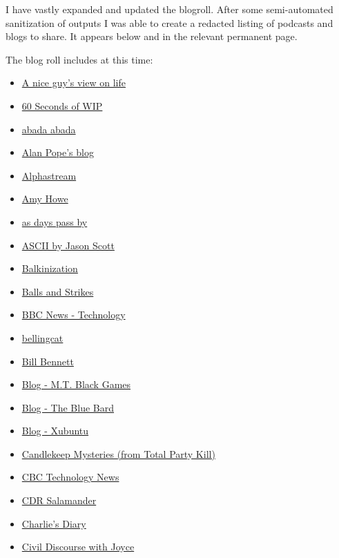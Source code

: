 I have vastly expanded and updated the blogroll. After some
semi-automated sanitization of outputs I was able to create a redacted
listing of podcasts and blogs to share. It appears below and in the
relevant permanent page.

The blog roll includes at this time:

\begin{itemize}
\item
  \href{https://jon.sprig.gs/blog}{A nice guy's view on life}
\item
  \href{https://mwl.io/}{60 Seconds of WIP}
\item
  \href{https://www.jessamyn.com/journal}{abada abada}
\item
  \href{https://popey.com/blog/}{Alan Pope's blog}
\item
  \href{https://alphastream.org/}{Alphastream}
\item
  \href{https://amylhowe.com/}{Amy Howe}
\item
  \href{https://www.kryogenix.org/days/}{as days pass by}
\item
  \href{http://ascii.textfiles.com/}{ASCII by Jason Scott}
\item
  \href{https://balkin.blogspot.com/}{Balkinization}
\item
  \href{https://ballsandstrikes.org/}{Balls and Strikes}
\item
  \href{https://www.bbc.co.uk/news/}{BBC News - Technology}
\item
  \href{https://www.bellingcat.com/}{bellingcat}
\item
  \href{https://billbennett.micro.blog/}{Bill Bennett}
\item
  \href{https://www.mtblackgames.com/blog/}{Blog - M.T. Black Games}
\item
  \href{https://www.thebluebard.com/blog/}{Blog - The Blue Bard}
\item
  \href{https://xubuntu.org/}{Blog - Xubuntu}
\item
  \href{https://www.theincomparable.com/tpk/candlekeep/}{Candlekeep
  Mysteries (from Total Party Kill)}
\item
  \href{https://www.cbc.ca/news/science?cmp=rss}{CBC Technology News}
\item
  \href{https://cdrsalamander.substack.com/}{CDR Salamander}
\item
  \href{http://www.antipope.org/charlie/blog-static/}{Charlie's Diary}
\item
  \href{https://joycevance.substack.com/}{Civil Discourse with Joyce
}
\end{itemize}
